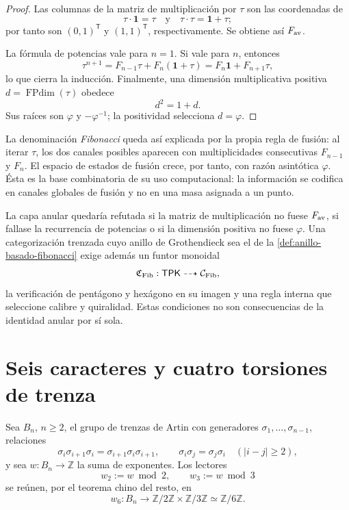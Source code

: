 \begin{proof}
Las columnas de la matriz de multiplicación por \(\tau\) son las coordenadas
de
\[
 \tau\cdot\mathbf 1=\tau
 \quad\text{y}\quad
 \tau\cdot\tau=\mathbf 1+\tau;
\]
por tanto son \((0,1)^{\mathsf T}\) y \((1,1)^{\mathsf T}\), respectivamente.
Se obtiene así \(F_{\rm av}\).

La fórmula de potencias vale para \(n=1\). Si vale para \(n\), entonces
\[
 \tau^{n+1}
 =F_{n-1}\tau+F_n(\mathbf 1+\tau)
 =F_n\mathbf 1+F_{n+1}\tau,
\]
lo que cierra la inducción. Finalmente, una dimensión multiplicativa positiva
\(d=\operatorname{FPdim}(\tau)\) obedece
\[
 d^2=1+d.
\]
Sus raíces son \(\varphi\) y \(-\varphi^{-1}\); la positividad selecciona
\(d=\varphi\).
\end{proof}

La denominación \emph{Fibonacci} queda así explicada por la propia regla de
fusión: al iterar \(\tau\), los dos canales posibles aparecen con
multiplicidades consecutivas \(F_{n-1}\) y \(F_n\). El espacio de estados de
fusión crece, por tanto, con razón asintótica \(\varphi\). Ésta es la base
combinatoria de su uso computacional: la información se codifica en canales
globales de fusión y no en una masa asignada a un punto.

\begin{criterion}
\label{crit:categorificacion-fibonacci}
La capa anular quedaría refutada si la matriz de multiplicación no fuese
\(F_{\rm av}\), si fallase la recurrencia de potencias o si la dimensión
positiva no fuese \(\varphi\). Una categorización trenzada cuyo anillo de
Grothendieck sea el de la \cref{def:anillo-basado-fibonacci} exige además un
funtor monoidal
\[
 \mathfrak C_{\rm Fib}:\mathsf{TPK}
 \dashrightarrow\mathcal C_{\rm Fib},
\]
la verificación de pentágono y hexágono en su imagen y una regla interna que
seleccione calibre y quiralidad.
Estas condiciones no son consecuencias de la identidad anular por sí sola.
\end{criterion}

\section[Caracteres de trenza]{Seis caracteres y cuatro torsiones de trenza}
\label{sec:rescate-trenzas-ex02}

Sea \(B_n\), \(n\geq2\), el grupo de trenzas de Artin con generadores
\(\sigma_1,\ldots,\sigma_{n-1}\), relaciones
\[
 \sigma_i\sigma_{i+1}\sigma_i
 =\sigma_{i+1}\sigma_i\sigma_{i+1},
 \qquad
 \sigma_i\sigma_j=\sigma_j\sigma_i\quad(|i-j|\geq2),
\]
y sea \(w:B_n\to\mathbb Z\) la suma de exponentes. Los lectores
\[
 w_2:=w\bmod2,\qquad w_3:=w\bmod3
\]
se reúnen, por el teorema chino del resto, en
\[
 w_6:B_n\longrightarrow
 \mathbb Z/2\mathbb Z\times\mathbb Z/3\mathbb Z
 \simeq\mathbb Z/6\mathbb Z.
\]

